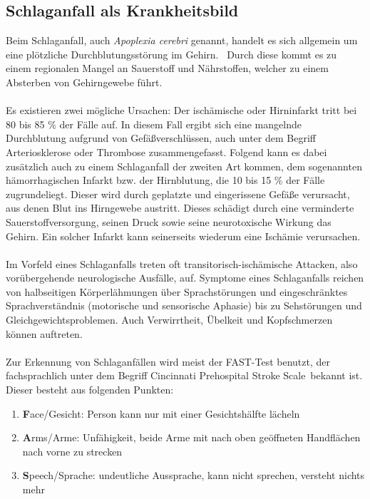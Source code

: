 \subsection{Schlaganfall als Krankheitsbild}
Beim Schlaganfall, auch \textit{Apoplexia cerebri} genannt, handelt es sich allgemein um eine \glqq plötzliche Durchblutungsstörung im Gehirn.\grqq ~\cite{Src:ApoNetdokt} Durch diese kommt es zu einem regionalen Mangel an Sauerstoff und Nährstoffen, welcher zu einem Absterben von Gehirngewebe führt.
\\ \\
Es existieren zwei mögliche Ursachen: Der ischämische oder Hirninfarkt tritt bei 80 bis 85 \% der Fälle auf. In diesem Fall ergibt sich eine mangelnde Durchblutung aufgrund von Gefäßverschlüssen, auch unter dem Begriff Arteriosklerose oder Thrombose zusammengefasst. Folgend kann es dabei zusätzlich auch zu einem Schlaganfall der zweiten Art kommen, dem sogenannten hämorrhagischen Infarkt bzw. der Hirnblutung, die 10 bis 15 \% der Fälle zugrundeliegt. Dieser wird durch geplatzte und eingerissene Gefäße verursacht, aus denen Blut ins Hirngewebe austritt. Dieses schädigt durch eine verminderte Sauerstoffversorgung, seinen Druck sowie seine neurotoxische Wirkung das Gehirn. Ein solcher Infarkt kann seinerseits wiederum eine Ischämie verursachen.\cite{Src:ApoFlex}
\\ \\
Im Vorfeld eines Schlaganfalls treten oft transitorisch-ischämische Attacken, also vorübergehende neurologische Ausfälle, auf. Symptome eines Schlaganfalls reichen von halbseitigen Körperlähmungen über Sprachstörungen und eingeschränktes Sprachverständnis (motorische und sensorische Aphasie) bis zu Sehstörungen und Gleichgewichtsproblemen. Auch Verwirrtheit, Übelkeit und Kopfschmerzen können auftreten.\cite{Src:ApoFlex}
\\ \\
Zur Erkennung von Schlaganfällen wird meist der FAST-Test benutzt, der fachsprachlich unter dem Begriff \glqq Cincinnati Prehospital Stroke Scale\grqq ~bekannt ist.\cite{Src:ApoWiki} Dieser besteht aus folgenden Punkten:
\begin{enumerate}
\item \textbf{F}ace/Gesicht: Person kann nur mit einer Gesichtshälfte lächeln
\item \textbf{A}rms/Arme: Unfähigkeit, beide Arme mit nach oben geöffneten Handflächen nach vorne zu strecken
\item \textbf{S}peech/Sprache: undeutliche Aussprache, kann nicht sprechen, versteht nichts mehr
\end{enumerate}
